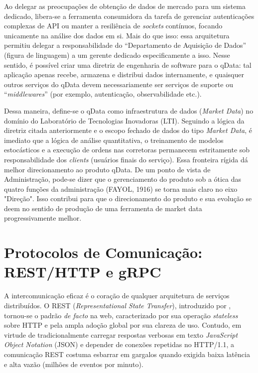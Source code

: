 Ao delegar as preocupações de obtenção de dados de mercado para um sistema dedicado, libera-se a ferramenta consumidora da tarefa de gerenciar autenticações complexas de API ou manter a resiliência de \textit{sockets} contínuos, focando unicamente na análise dos dados em si. Mais do que isso: essa arquitetura permitiu delegar a responsabilidade do ``Departamento de Aquisição de Dados'' (figura de linguagem) a um gerente dedicado especificamente a isso. Nesse sentido, é possível criar uma diretriz de engenharia de software para o qData: tal aplicação apenas recebe, armazena e distribui dados internamente, e quaisquer outros serviços do qData devem necessariamente ser serviços de suporte ou ``\textit{middlewares}'' (por exemplo, autenticação, observabilidade etc.).

Dessa maneira, define-se o qData como infraestrutura de dados (\textit{Market Data}) no domínio do Laboratório de Tecnologias Inovadoras (LTI). Seguindo a lógica da diretriz citada anteriormente e o escopo fechado de dados do tipo \textit{Market Data}, é imediato que a lógica de análise quantitativa, o treinamento de modelos estocásticos e a execução de ordens nas corretoras permanecem estritamente sob responsabilidade dos \textit{clients} (usuários finais do serviço). Essa fronteira rígida dá melhor direcionamento ao produto qData. De um ponto de vista de Administração, pode-se dizer que o gerenciamento do produto sob a ótica das quatro funções da administração (FAYOL, 1916) se torna mais claro no eixo "Direção". Isso contribui para que o direcionamento do produto e sua evolução se deem no sentido de produção de uma ferramenta de market data progressivamente melhor.

\section{Protocolos de Comunicação: REST/HTTP e gRPC}

A intercomunicação eficaz é o coração de qualquer arquitetura de serviços distribuídos. O REST (\textit{Representational State Transfer}), introduzido por , tornou-se o padrão \textit{de facto} na web, caracterizado por sua operação \textit{stateless} sobre HTTP e pela ampla adoção global por sua clareza de uso. Contudo, em virtude de tradicionalmente carregar respostas verbosas em texto \textit{JavaScript Object Notation} (JSON) e depender de conexões repetidas no HTTP/1.1, a comunicação REST costuma esbarrar em gargalos quando exigida baixa latência e alta vazão (milhões de eventos por minuto).

